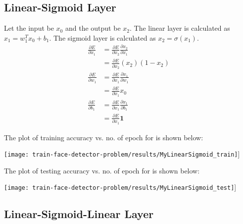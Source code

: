 \documentclass[twoside,12pt]{article}
\newcommand{\imsize}{0.5\linewidth}
\begin{document}
\subsection{Linear-Sigmoid Layer}

Let the input be $x_0$ and the output be $x_2$. The linear layer is calculated as $x_1=w_1^Tx_0+b_1$.
The sigmoid layer is calculated as $x_2=\sigma(x_1)$.
\begin{equation}
\begin{split}
\frac{\partial E}{\partial x_1} &= \frac{\partial E}{\partial x_2} \frac{\partial x_2}{\partial x_1} \\
							    &= \frac{\partial E}{\partial x_2} (x_2) (1-x_2) \\
\frac{\partial E}{\partial w_1} &= \frac{\partial E}{\partial x_1} \frac{\partial x_1}{\partial w_1} \\
							    &= \frac{\partial E}{\partial x_1} x_0 \\
\frac{\partial E}{\partial b_1} &= \frac{\partial E}{\partial x_1} \frac{\partial x_1}{\partial b_1} \\
							    &= \frac{\partial E}{\partial x_1} \mathbf{1} 
\end{split}
\end{equation}

The plot of training accuracy vs. no. of epoch for is shown below:

\texttt{[image: train-face-detector-problem/results/MyLinearSigmoid\_train]}]

The plot of testing accuracy vs. no. of epoch for is shown below:

\texttt{[image: train-face-detector-problem/results/MyLinearSigmoid\_test]}]

\subsection{Linear-Sigmoid-Linear Layer}
\end{document}
